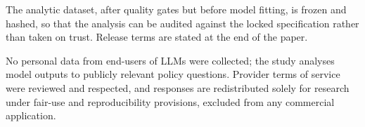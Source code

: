 The analytic dataset, after quality gates but before model fitting, is frozen
and hashed, so that the analysis can be audited against the locked
specification rather than taken on trust. Release terms are stated at the end
of the paper.

No personal data from end-users of LLMs were collected; the study analyses
model outputs to publicly relevant policy questions. Provider terms of service
were reviewed and respected, and responses are redistributed solely for
research under fair-use and reproducibility provisions, excluded from any
commercial application.
